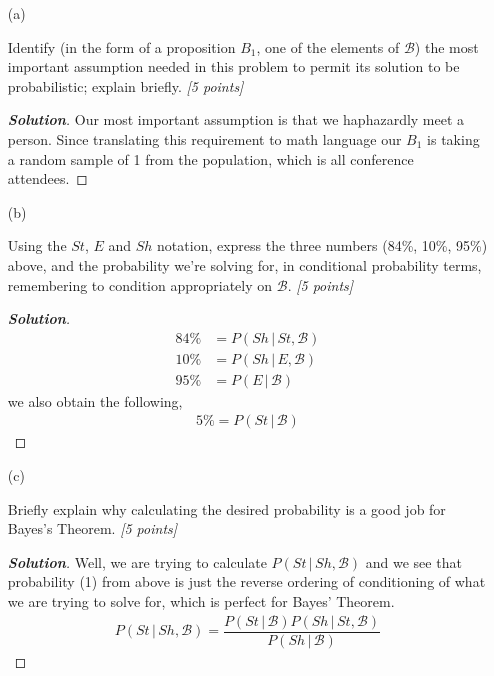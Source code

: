 \documentclass[12pt]{article}
\newcommand{\given}{\, | \,}
\newenvironment{solution}{\begin{proof}[\textbf{\textit{Solution}}] }{\end{proof}}
\begin{document}
\begin{itemize}


\item[(a)]

Identify (in the form of a proposition $B_1$, one of the elements of $\mathcal{ B }$) the most important assumption needed in this problem to permit  its solution to be probabilistic; explain briefly. \textit{[5 points]}
\begin{solution}
    Our most important assumption is that we haphazardly meet a person. Since translating this requirement to math language our $B_1$ is taking a random sample of 1 from the population, which is all conference attendees.
\end{solution}

\vspace*{0.75in}

\item[(b)]
 
Using the $St$, $E$ and $Sh$ notation, express the three numbers (84\%, 10\%, 95\%) above, and the probability we're solving for, in conditional probability terms, remembering to condition appropriately on $\mathcal{ B }$. \textit{[5 points]}
\begin{solution}
    \begin{align}
        84\% &= P(Sh \given St, \mathcal{ B}) \\
        10\% &= P(Sh \given  E, \mathcal{B}) \\
        95\% &= P(E \given \mathcal{B})
    \end{align}
    we also obtain the following,
    \begin{align}
        5\% = P(St \given \mathcal{B})
    \end{align}
\end{solution}

\vspace*{0.75in}

\item[(c)]

Briefly explain why calculating the desired probability is a good job for Bayes's Theorem. \textit{[5 points]}
\begin{solution}
    Well, we are trying to calculate $P(St \given Sh, \mathcal{B} )$ and we see that probability (1) from above is just the reverse ordering of conditioning of what we are trying to solve for, which is perfect for Bayes' Theorem. 
    \begin{align*}
        P(St \given Sh, \mathcal{B}) = \dfrac{P(St \given \mathcal{B}) P(Sh \given St, \mathcal{B})}{P(Sh \given \mathcal{B})}
    \end{align*}
\end{solution}

\vspace*{0.7in}

\end{itemize}
\end{document}
